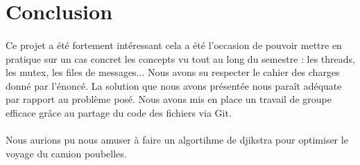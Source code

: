 \documentclass[12pt]{article}
\begin{document}
\section{Conclusion}
\paragraph{}Ce projet a été fortement intéressant cela a été l'occasion de pouvoir mettre en pratique sur un cas concret les concepts vu tout au long du semestre : les threads, les mutex, les files de messages... Nous avons su respecter le cahier des charges donné par l'énoncé. La solution que nous avons présentée nous paraît adéquate par rapport au problème posé. Nous avons mis en place un travail de groupe efficace grâce au partage du code des fichiers via Git.
\paragraph{}Nous aurions pu nous amuser à faire un algortihme de djikstra pour optimiser le voyage du camion poubelles.
\end{document}
